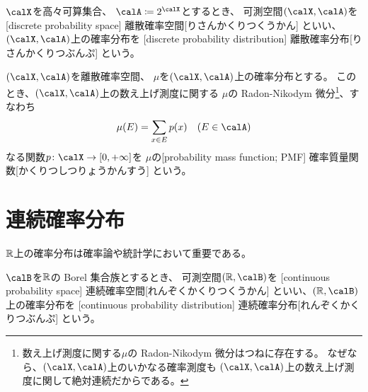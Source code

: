 \documentclass[report]{jlreq}
\begin{document}
\begin{definition}[離散確率分布]
    $\calX$を高々可算集合、
    $\calA \coloneqq 2^{\calX}$とするとき、
    可測空間$(\calX, \calA)$を
    [discrete probability space]
        {離散確率空間}[りさんかくりつくうかん]
    といい、$(\calX, \calA)$上の確率分布を
    [discrete probability distribution]
        {離散確率分布}[りさんかくりつぶんぷ]
    という。
\end{definition}

\begin{definition}[確率質量関数]
    $(\calX, \calA)$を離散確率空間、
    $\mu$を$(\calX, \calA)$上の確率分布とする。
    このとき、$(\calX, \calA)$上の数え上げ測度に関する
    $\mu$の Radon-Nikodym 微分\footnote{
        数え上げ測度に関する$\mu$の Radon-Nikodym 微分はつねに存在する。
        なぜなら、$(\calX, \calA)$上のいかなる確率測度も
        $(\calX, \calA)$上の数え上げ測度に関して絶対連続だからである。
    }、すなわち
    \begin{equation}
        \mu(E)
            = \sum_{x \in E} p(x)
            \quad (E \in \calA)
    \end{equation}
    なる関数$p \colon \calX \to [0, +\infty]$を
    $\mu$の[probability mass function; PMF]
        {確率質量関数}[かくりつしつりょうかんすう]
    という。
\end{definition}

\begin{definition}[確率母関数]
    \TODO{}
\end{definition}

%
\section{連続確率分布}

$\mathbb{R}$上の確率分布は確率論や統計学において重要である。

\begin{definition}[連続確率分布]
    $\calB$を$\mathbb{R}$の Borel 集合族とするとき、
    可測空間$(\R, \calB)$を
    [continuous probability space]
        {連続確率空間}[れんぞくかくりつくうかん]
    といい、$(\R, \calB)$上の確率分布を
    [continuous probability distribution]
        {連続確率分布}[れんぞくかくりつぶんぷ]
    という。
\end{definition}
\end{document}
